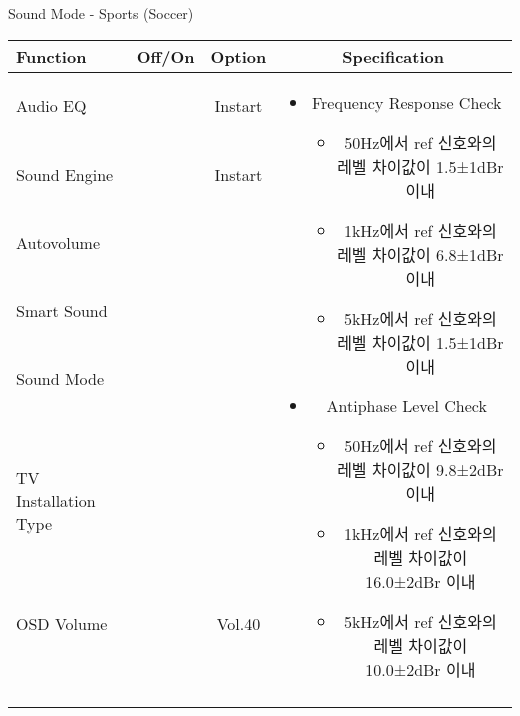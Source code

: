 \begin{frame}[t]{Sound Mode - Sports (Soccer)}
\begin{tiny}
\begin{tabular}{@{}lccc@{}}
\toprule
Function & Off/On & Option & Specification \\
\midrule
Audio EQ & \color{black}{Off} & Instart &
\multirow{10}{60mm}{
\begin{itemize}
	\item Frequency Response Check
	\begin{itemize}
		\item 50Hz에서 ref 신호와의 레벨 차이값이 1.5±1dBr 이내
		\item 1kHz에서 ref 신호와의 레벨 차이값이 6.8±1dBr 이내
		\item 5kHz에서 ref 신호와의 레벨 차이값이 1.5±1dBr 이내	
	\end{itemize}
	\item Antiphase Level Check
	\begin{itemize}
		\item 50Hz에서 ref 신호와의 레벨 차이값이 9.8±2dBr 이내
		\item 1kHz에서 ref 신호와의 레벨 차이값이 16.0±2dBr 이내
		\item 5kHz에서 ref 신호와의 레벨 차이값이 10.0±2dBr 이내
	\end{itemize}
\end{itemize}
} \\
Sound Engine & \color{blue}{On} & Instart & \\
Autovolume & \color{black}{Off} & & \\
Smart Sound & \color{black}{Off} & & \\
Sound Mode & \color{blue}{On} & \color{blue}{Sports} & \\
TV Installation Type & \color{blue}{On} & \color{black}{Standtype1} & \\
OSD Volume & \color{blue}{On} & Vol.40 & \\
& & & \\
& & & \\
& & & \\
& & & \\
\midrule
\end{tabular}
\end{tiny}


\end{frame}